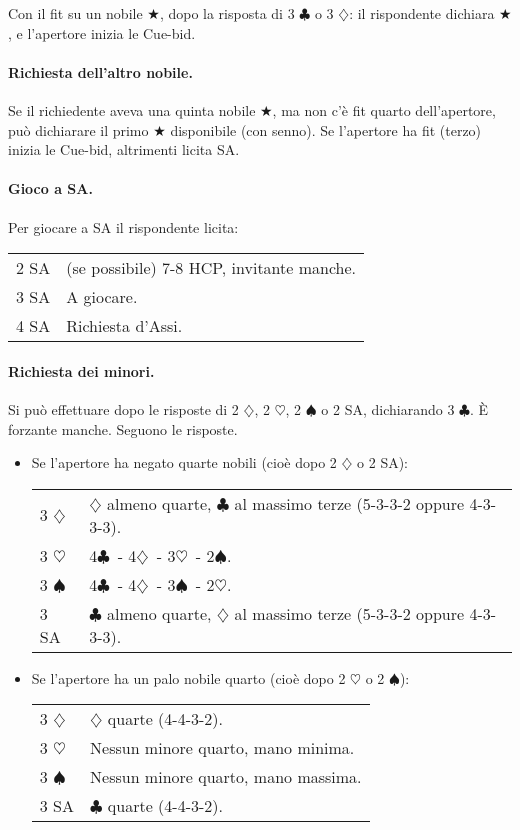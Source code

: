 \documentclass[a4paper,10pt]{article}
\renewcommand{\c}{$\clubsuit$\xspace}
\renewcommand{\d}{$\diamondsuit$\xspace}
\newcommand{\h}{$\heartsuit$\xspace}
\newcommand{\s}{$\spadesuit$\xspace}
\renewcommand{\j}{$\bigstar$\xspace}
\newcommand{\sa}{SA\xspace}
\newcommand{\smallspace}{\vskip0.3cm}
\newenvironment{twocol}
  {\smallspace\noindent\begin{tabular}{l p{0.8\textwidth}}}
  {\end{tabular}\smallspace}
\begin{document}
\noindent Con il fit su un nobile \j, dopo la risposta di 3 \c o 3 \d: il rispondente dichiara \j, e l'apertore inizia le Cue-bid.


\paragraph{Richiesta dell'altro nobile.}
Se il richiedente aveva una quinta nobile \j, ma non c'\`e fit quarto dell'apertore, può dichiarare il primo \j disponibile (con senno). Se l'apertore ha fit (terzo) inizia le Cue-bid, altrimenti licita \sa.

\paragraph{Gioco a SA.}
Per giocare a SA il rispondente licita:
\begin{twocol}
 2 \sa & (se possibile) 7-8 HCP, invitante manche.\\
 3 \sa & A giocare.\\
 4 \sa & Richiesta d'Assi.
\end{twocol}

\paragraph{Richiesta dei minori.} Si può effettuare dopo le risposte di 2 \d, 2 \h, 2 \s o 2 \sa, dichiarando 3 \c. È forzante manche. Seguono le risposte.

\begin{itemize}
 \item Se l'apertore ha negato quarte nobili (cioè dopo 2 \d o 2 \sa):
  \begin{twocol}
    3 \d & \d almeno quarte, \c al massimo terze (5-3-3-2 oppure 4-3-3-3).\\
    3 \h & 4\c\ - 4\d\ - 3\h\ - 2\s.\\
    3 \s & 4\c\ - 4\d\ - 3\s\ - 2\h.\\
    3 \sa & \c almeno quarte, \d al massimo terze (5-3-3-2 oppure 4-3-3-3).
  \end{twocol}

 \item Se l'apertore ha un palo nobile quarto (cioè dopo 2 \h o 2 \s):
  \begin{twocol}
    3 \d & \d quarte (4-4-3-2).\\
    3 \h & Nessun minore quarto, mano minima.\\
    3 \s & Nessun minore quarto, mano massima.\\
    3 \sa & \c quarte (4-4-3-2).
  \end{twocol}
\end{itemize}
\end{document}

